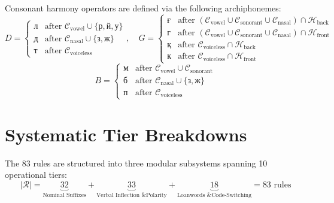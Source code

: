 Consonant harmony operators are defined via the following archiphonemes:
\begin{equation}
D = \begin{cases}
\text{л} & \text{after } \mathcal{C}_{\text{vowel}} \cup \{\text{р}, \text{й}, \text{у}\} \\
\text{д} & \text{after } \mathcal{C}_{\text{nasal}} \cup \{\text{з}, \text{ж}\} \\
\text{т} & \text{after } \mathcal{C}_{\text{voiceless}}
\end{cases}, \quad
G = \begin{cases}
\text{ғ} & \text{after } (\mathcal{C}_{\text{vowel}} \cup \mathcal{C}_{\text{sonorant}} \cup \mathcal{C}_{\text{nasal}}) \cap \mathcal{H}_{\text{back}} \\
\text{г} & \text{after } (\mathcal{C}_{\text{vowel}} \cup \mathcal{C}_{\text{sonorant}} \cup \mathcal{C}_{\text{nasal}}) \cap \mathcal{H}_{\text{front}} \\
\text{қ} & \text{after } \mathcal{C}_{\text{voiceless}} \cap \mathcal{H}_{\text{back}} \\
\text{к} & \text{after } \mathcal{C}_{\text{voiceless}} \cap \mathcal{H}_{\text{front}}
\end{cases}
\end{equation}
\begin{equation}
B = \begin{cases}
\text{м} & \text{after } \mathcal{C}_{\text{vowel}} \cup \mathcal{C}_{\text{sonorant}} \\
\text{б} & \text{after } \mathcal{C}_{\text{nasal}} \cup \{\text{з}, \text{ж}\} \\
\text{п} & \text{after } \mathcal{C}_{\text{voiceless}}
\end{cases}
\end{equation}

\section{Systematic Tier Breakdowns}
\label{sec:app_fst_tier_breakdowns}

The 83 rules are structured into three modular subsystems spanning 10 operational tiers:
\begin{equation}
\label{eq:fst_partition}
|\mathcal{R}| = \underbrace{32}_{\text{Nominal Suffixes}} + \underbrace{33}_{\text{Verbal Inflection \& Polarity}} + \underbrace{18}_{\text{Loanwords \& Code-Switching}} = 83 \text{ rules}
\end{equation}

